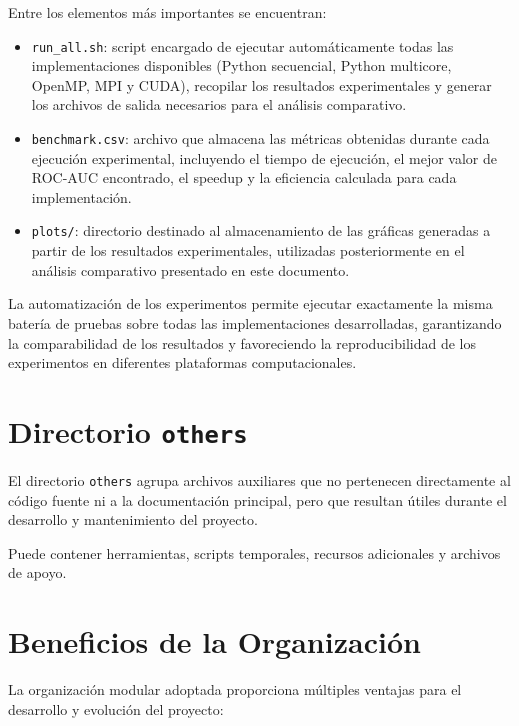 Entre los elementos más importantes se encuentran:

\begin{itemize}

\item \texttt{run\_all.sh}: script encargado de ejecutar automáticamente todas las implementaciones disponibles (Python secuencial, Python multicore, OpenMP, MPI y CUDA), recopilar los resultados experimentales y generar los archivos de salida necesarios para el análisis comparativo.

\item \texttt{benchmark.csv}: archivo que almacena las métricas obtenidas durante cada ejecución experimental, incluyendo el tiempo de ejecución, el mejor valor de ROC-AUC encontrado, el speedup y la eficiencia calculada para cada implementación.

\item \texttt{plots/}: directorio destinado al almacenamiento de las gráficas generadas a partir de los resultados experimentales, utilizadas posteriormente en el análisis comparativo presentado en este documento.

\end{itemize}

La automatización de los experimentos permite ejecutar exactamente la misma batería de pruebas sobre todas las implementaciones desarrolladas, garantizando la comparabilidad de los resultados y favoreciendo la reproducibilidad de los experimentos en diferentes plataformas computacionales.

\section{Directorio \texttt{others}}

El directorio \texttt{others} agrupa archivos auxiliares que no pertenecen directamente al código fuente ni a la documentación principal, pero que resultan útiles durante el desarrollo y mantenimiento del proyecto.

Puede contener herramientas, scripts temporales, recursos adicionales y archivos de apoyo.

\section{Beneficios de la Organización}

La organización modular adoptada proporciona múltiples ventajas para el desarrollo y evolución del proyecto:

